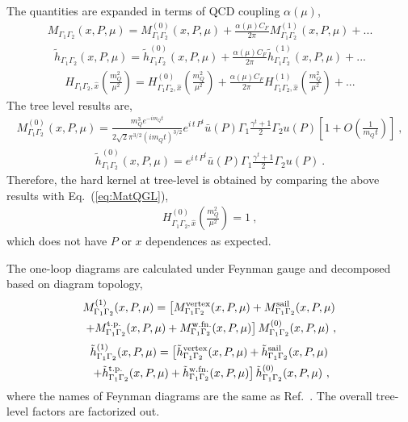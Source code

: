 \documentclass[a4paper,11pt]{article}
\begin{document}
The quantities are expanded in terms of QCD coupling $\alpha(\mu)$,
\begin{align}
M_{\Gamma_1 \Gamma_2}(x,P,\mu) = M^{(0)}_{\Gamma_1 \Gamma_2}(x,P,\mu) + \frac{\alpha(\mu) C_F}{2\pi} M^{(1)}_{\Gamma_1 \Gamma_2}(x,P,\mu) + ...
\end{align}
\begin{align}
\tilde{h}_{\Gamma_1\Gamma_2}\left(x,P,\mu\right) = \tilde{h}^{(0)}_{\Gamma_1 \Gamma_2}(x,P,\mu) + \frac{\alpha(\mu) C_F}{2\pi} \tilde{h}^{(1)}_{\Gamma_1 \Gamma_2}(x,P,\mu) + ...
\end{align}
\begin{align}
H_{\Gamma_1\Gamma_2,\hat{x}}\left(\frac{m_{Q}^2} {\mu^2}\right) = H^{(0)}_{\Gamma_1 \Gamma_2,\hat{x}}\left(\frac{m_{Q}^2} {\mu^2}\right) + \frac{\alpha(\mu) C_F}{2\pi} H^{(1)}_{\Gamma_1 \Gamma_2,\hat{x}}\left(\frac{m_{Q}^2} {\mu^2}\right) + ...
\end{align}
The tree level results are,
\begin{align}
M^{(0)}_{\Gamma_1 \Gamma_2}(x,P,\mu) =  \frac{m_Q^3 e^{-i m_Q t}}{2 \sqrt{2} \pi ^{3/2} \left(i m_Q t\right)^{3/2}} e^{i \,t \, P^t} \bar{u}(P) \Gamma_1 \frac{\gamma^t + 1}{2} \Gamma_2 u(P) \left[ 1+O\left(\frac{1}{m_Q t}\right)\right]  \ ,
\end{align}
\begin{align}
\tilde{h}^{(0)}_{\Gamma_1 \Gamma_2}(x,P,\mu) = e^{i \,t \, P^t} \bar{u}(P) \Gamma_1 \frac{\gamma^t + 1}{2} \Gamma_2 u(P) \ .
\end{align}
Therefore, the hard kernel at tree-level is obtained by comparing the above results with Eq.~(\ref{eq:MatQGL}),
\begin{align}
H^{(0)}_{\Gamma_1\Gamma_2,\hat{x}}\left(\frac{m_{Q}^2} {\mu^2}\right) = 1 \ ,
\end{align}
which does not have $P$ or $x$ dependences as expected. 

The one-loop diagrams are calculated under Feynman gauge and decomposed based on diagram topology,
\begin{align}
&M^{(1)}_{\Gamma_1 \Gamma_2}(x,P,\mu) = \left[ M^{\rm vertex}_{\Gamma_1 \Gamma_2}(x,P,\mu) + M^{\rm sail}_{\Gamma_1 \Gamma_2}(x,P,\mu) \right.\nonumber\\
&\left.+ M^{\rm t.p.}_{\Gamma_1 \Gamma_2}(x,P,\mu)  + M^{\rm w.fn.}_{\Gamma_1 \Gamma_2}(x,P,\mu) \right] M^{(0)}_{\Gamma_1 \Gamma_2}(x,P,\mu)  \ ,
\end{align}
\begin{align}
\tilde{h}^{(1)}_{\Gamma_1 \Gamma_2}(x,P,\mu) = \left[ \tilde{h}^{\rm vertex}_{\Gamma_1 \Gamma_2}(x,P,\mu) + \tilde{h}^{\rm sail}_{\Gamma_1 \Gamma_2}(x,P,\mu) \right.\nonumber\\
\left.+ \tilde{h}^{\rm t.p.}_{\Gamma_1 \Gamma_2}(x,P,\mu)  + \tilde{h}^{\rm w.fn.}_{\Gamma_1 \Gamma_2}(x,P,\mu) \right] \tilde{h}^{(0)}_{\Gamma_1 \Gamma_2}(x,P,\mu) \ ,
\end{align}
where the names of Feynman diagrams are the same as Ref.~\cite{Izubuchi:2018srq}. The overall tree-level factors are factorized out. 
\end{document}
